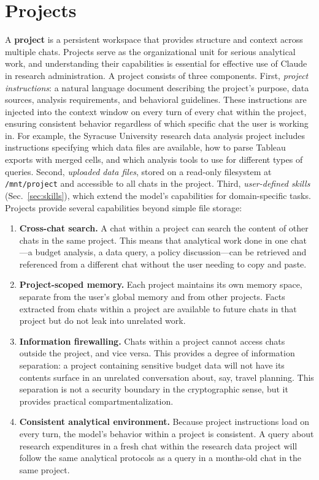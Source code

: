 \documentclass[12pt]{article}
\begin{document}
\section{Projects}
\label{sec:projects}

A \textbf{project} is a persistent workspace that provides structure and context across multiple chats. Projects serve as the organizational unit for serious analytical work, and understanding their capabilities is essential for effective use of Claude in research administration. A project consists of three components. First, \emph{project instructions}: a natural language document describing the project's purpose, data sources, analysis requirements, and behavioral guidelines. These instructions are injected into the context window on every turn of every chat within the project, ensuring consistent behavior regardless of which specific chat the user is working in. For example, the Syracuse University research data analysis project includes instructions specifying which data files are available, how to parse Tableau exports with merged cells, and which analysis tools to use for different types of queries. Second, \emph{uploaded data files}, stored on a read-only filesystem at \texttt{/mnt/project} and accessible to all chats in the project. Third, \emph{user-defined skills} (Sec.~\ref{sec:skills}), which extend the model's capabilities for domain-specific tasks. Projects provide several capabilities beyond simple file storage:

\begin{enumerate}
\item \textbf{Cross-chat search.} A chat within a project can search the content of other chats in the same project. This means that analytical work done in one chat---a budget analysis, a data query, a policy discussion---can be retrieved and referenced from a different chat without the user needing to copy and paste.

\item \textbf{Project-scoped memory.} Each project maintains its own memory space, separate from the user's global memory and from other projects. Facts extracted from chats within a project are available to future chats in that project but do not leak into unrelated work.

\item \textbf{Information firewalling.} Chats within a project cannot access chats outside the project, and vice versa. This provides a degree of information separation: a project containing sensitive budget data will not have its contents surface in an unrelated conversation about, say, travel planning. This separation is not a security boundary in the cryptographic sense, but it provides practical compartmentalization.

\item \textbf{Consistent analytical environment.} Because project instructions load on every turn, the model's behavior within a project is consistent. A query about research expenditures in a fresh chat within the research data project will follow the same analytical protocols as a query in a months-old chat in the same project.
\end{enumerate}
\end{document}
